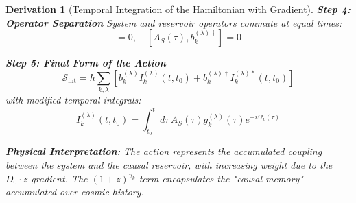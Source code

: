 \documentclass[10pt, a4paper]{article}
\newtheorem{derivation}{Derivation}
\begin{document}
\begin{derivation}[Temporal Integration of the Hamiltonian with Gradient]
\textbf{Step 4: Operator Separation}
System and reservoir operators commute at equal times:
\begin{equation}
[A_S(\tau), b_{k}^{(\lambda)}] = 0, \quad [A_S(\tau), b_{k}^{(\lambda)\dagger}] = 0
\tag{10.6}
\end{equation}

\textbf{Step 5: Final Form of the Action}
\begin{equation}
\mathcal{S}_{\text{int}} = \hbar \sum_{k,\lambda} \left[ b_{k}^{(\lambda)} I_{k}^{(\lambda)}(t,t_0) + b_{k}^{(\lambda)\dagger} I_{k}^{(\lambda)*}(t,t_0) \right]
\tag{10.7}
\end{equation}
with modified temporal integrals:
\begin{equation}
I_{k}^{(\lambda)}(t,t_0) = \int_{t_0}^{t} d\tau \, A_S(\tau) g_{k}^{(\lambda)}(\tau) e^{-i\Omega_k(\tau)}
\tag{10.8}
\end{equation}

\textbf{Physical Interpretation}: The action represents the accumulated coupling between the system and the causal reservoir, with increasing weight due to the $D_0 \cdot z$ gradient. The $(1+z)^{\gamma_k}$ term encapsulates the "causal memory" accumulated over cosmic history.
\end{derivation}

\end{document}
